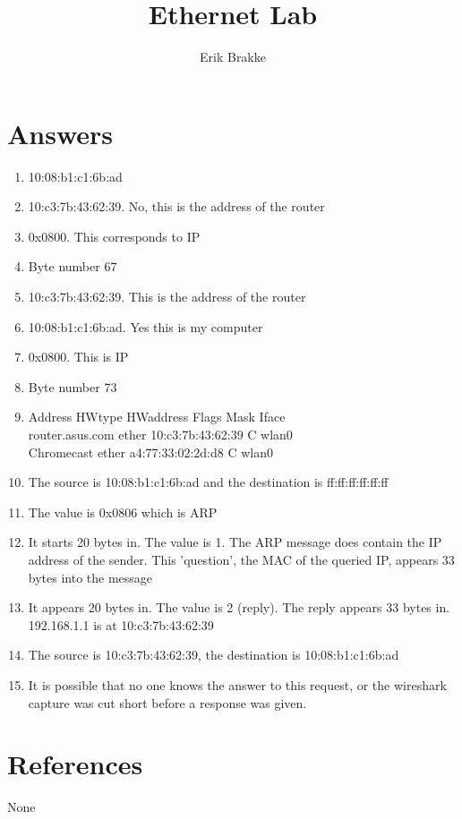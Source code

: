 \documentclass[11pt]{article}
\theoremstyle{definition}
\begin{document}
\title{Ethernet Lab}
\author{Erik Brakke}
\maketitle

\thispagestyle{fancy}
 
 
\section*{Answers}
\begin{enumerate}
	\item 10:08:b1:c1:6b:ad
	\item 10:c3:7b:43:62:39.  No, this is the address of the router
	\item 0x0800.  This corresponds to IP
	\item Byte number 67
	\item 10:c3:7b:43:62:39.  This is the address of the router
	\item 10:08:b1:c1:6b:ad.  Yes this is my computer
	\item 0x0800.  This is IP
	\item Byte number 73
	\item Address                  HWtype  HWaddress           Flags Mask            Iface\\
		  router.asus.com          ether   10:c3:7b:43:62:39   C                     wlan0\\
          Chromecast               ether   a4:77:33:02:2d:d8   C                     wlan0\\
 
	\item The source is 10:08:b1:c1:6b:ad and the destination is ff:ff:ff:ff:ff:ff
	\item The value is 0x0806 which is ARP
	\item It starts 20 bytes in.  The value is 1.  The ARP message does contain the IP address of the sender. This 'question', the MAC of the queried IP, appears 33 bytes into the message
	\item It appears 20 bytes in.  The value is 2 (reply).  The reply appears 33 bytes in. 192.168.1.1 is at 10:c3:7b:43:62:39
	\item The source is 10:c3:7b:43:62:39, the destination is 10:08:b1:c1:6b:ad
	\item It is possible that no one knows the answer to this request, or the wireshark capture was cut short before a response was given.


\end{enumerate}


\noindent\hrulefill


\section*{References}

None
\end{document}
